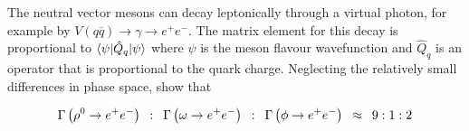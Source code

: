 \begin{problem}{9.5}
The neutral vector mesons can decay leptonically through a virtual photon, for example by $V(q\overbar{q}) \to \gamma \to e^+e^-$. The matrix element for this decay is proportional to $\braket{\psi|\hat{Q}_q|\psi}$ where $\psi$ is the meson flavour wavefunction and $\hat{Q}_q$ is an operator that is proportional to the quark charge. Neglecting the relatively small differences in phase space, show that

\begin{align*}
    \Gamma \left( \rho^0 \to e^+e^- \right) \hskip0.5em\relax  : \hskip0.5em\relax   \Gamma \left( \omega \to  e^+e^- \right) \hskip0.5em\relax : \hskip0.5em\relax   \Gamma \left( \phi \to e^+e^- \right) \hskip0.5em\relax \approx \hskip0.5em\relax 9:1:2
\end{align*}\\
\end{problem}
